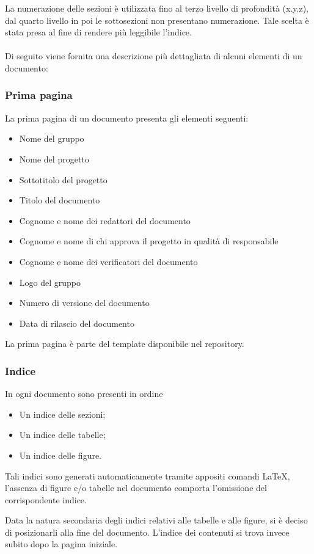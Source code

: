 \documentclass[a4paper]{article}
\begin{document}
		La numerazione delle sezioni è utilizzata fino al terzo livello di profondità (x.y.z), dal quarto livello in poi le sottosezioni
		 non presentano numerazione. Tale scelta è stata presa al fine di rendere più leggibile l'indice.
		\\ \\
		Di seguito viene fornita una descrizione più dettagliata di alcuni elementi di un documento:
		\subsubsection{Prima pagina}
		La prima pagina di un documento presenta gli elementi seguenti:
		\begin{itemize}
			\item Nome del gruppo
			\item Nome del progetto
			\item Sottotitolo del progetto
			\item Titolo del documento
			\item Cognome e nome dei redattori del documento
			\item Cognome e nome di chi approva il progetto in qualità di responsabile
			\item Cognome e nome dei verificatori del documento
			\item Logo del gruppo
			\item Numero di versione del documento
			\item Data di rilascio del documento
		\end{itemize}
		La prima pagina è parte del template disponibile nel repository.
		\subsubsection{Indice}
			In ogni documento sono presenti in ordine
			\begin{itemize}
				\item Un indice delle sezioni;
				\item Un indice delle tabelle;
				\item Un indice delle figure.
			\end{itemize}
			Tali indici sono generati automaticamente tramite appositi comandi \LaTeX, l'assenza di figure
			e/o tabelle nel documento comporta l'omissione del corrispondente indice.

		Data la natura secondaria degli indici relativi alle tabelle e alle figure, si è deciso di posizionarli alla fine del documento.
		L'indice dei contenuti si trova invece subito dopo la pagina iniziale.
\end{document}
